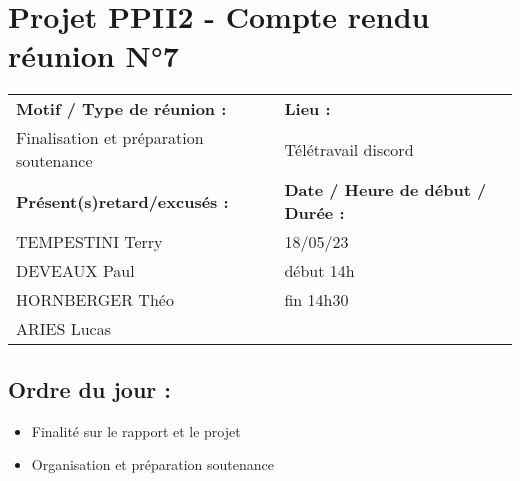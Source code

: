 \documentclass{article}
\begin{document}
\section*{Projet PPII2 - Compte rendu réunion N°7}
\begin{tabular}{|p{7cm}|p{6cm}|}
    \hline
    \textbf{Motif / Type de réunion :}
    & \textbf{Lieu :}
    \\
    Finalisation et préparation soutenance
    & 
    Télétravail discord
    \\ \hline
    \textbf{Présent(s)retard/excusés :}
    &
    \textbf{Date / Heure de début / Durée :}
    \\ 
    TEMPESTINI Terry &  18/05/23\\  
    DEVEAUX Paul & début 14h\\
    HORNBERGER Théo & fin 14h30\\
    ARIES Lucas & 
    \\ \hline
\end{tabular}

\subsection*{Ordre du jour :}
\begin{itemize}
    \item{Finalité sur le rapport et le projet}
    \item{Organisation et préparation soutenance}
\end{itemize}
\end{document}
